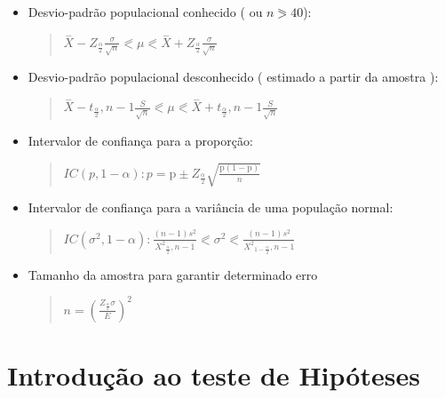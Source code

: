 \documentclass{article}
\begin{document}
  \begin{itemize}
    \item Desvio-padrão populacional conhecido ( ou $ n  \eqslantgtr 40 $):
    \begin{quote}\begin{large}
      $ \overset{-}{X} - Z_{\frac{\alpha}{2}}\frac{\sigma}{\sqrt{n}} \eqslantless \mu \eqslantless \overset{-}{X} + Z_{\frac{\alpha}{2}}\frac{\sigma}{\sqrt{n}} $  
    \end{large}\end{quote}
    \item Desvio-padrão populacional desconhecido ( estimado a partir da amostra ):
    \begin{quote}\begin{large}
      $ \overset{-}{X} - t_{\frac{\alpha}{2}}, n-1 \frac{S}{\sqrt{n}} \eqslantless \mu \eqslantless \overset{-}{X} + t_{\frac{\alpha}{2}}, n-1 \frac{S}{\sqrt{n}}  $ 
    \end{large}\end{quote}
    \item Intervalor de confiança para a proporção:
    \begin{quote}\begin{large}
      $ IC(p,1-\alpha) : p = \mbox{\^p} \pm Z_{\frac{\alpha}{2}} \sqrt{\frac{\mbox{\^p}(1-\mbox{\^p})}{n}} $
    \end{large}\end{quote}
    \item Intervalor de confiança para a variância de uma população normal:
    \begin{quote}
      \begin{large}
        \( IC(\sigma^2,1-\alpha) : \frac{(n-1)s^2}{{X^2}_{\frac{\alpha}{2}},n-1} \eqslantless \sigma^2 \eqslantless \frac{(n-1)s^2}{{X^2}_{1- \frac{\alpha}{2}},n-1} \)        
    \end{large}\end{quote}
    \item Tamanho da amostra para garantir determinado erro
    \begin{quote}\begin{large}
      $ n = (\frac{Z_{\frac{\alpha}{2}} \sigma }{E})^2 $
    \end{large}\end{quote}
  \end{itemize}

\section{Introdução ao teste de Hipóteses}
\end{document}

